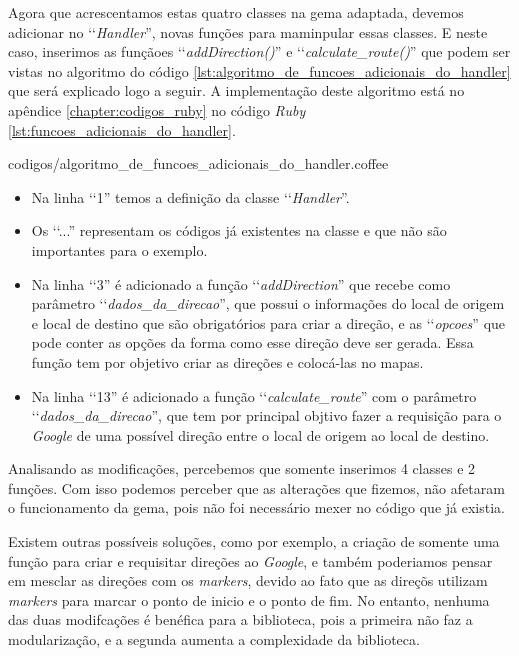 Agora que acrescentamos estas quatro classes na gema adaptada, devemos adicionar no ‘‘\emph{Handler}'', 
novas funções para maminpular essas classes. E neste caso, inserimos as funçãoes ‘‘\emph{addDirection()}'' e 
‘‘\emph{calculate\_route()}'' que podem ser vistas no algoritmo do código
\ref{lst:algoritmo_de_funcoes_adicionais_do_handler} que será explicado logo a seguir. A implementação deste
algoritmo está no apêndice \ref{chapter:codigos_ruby} no código \emph{Ruby}
\ref{lst:funcoes_adicionais_do_handler}.


{codigos/algoritmo_de_funcoes_adicionais_do_handler.coffee}

\begin{itemize}

 \item Na linha ‘‘1'' temos a definição da classe ‘‘\emph{Handler}''.
 
 \item Os ‘‘...'' representam os códigos já existentes na classe e que não são importantes para o
 exemplo.

 \item Na linha ‘‘3'' é adicionado a função ‘‘\emph{addDirection}'' que recebe como parâmetro 
 ‘‘\emph{dados\_da\_direcao}'', que possui o informações do local de origem e local de destino que são 
 obrigatórios para criar a direção, e as ‘‘\emph{opcoes}'' que pode conter as opções da forma
 como esse direção deve ser gerada. Essa função tem por objetivo criar as direções e colocá-las no mapas.
 
 \item Na linha ‘‘13'' é adicionado a função ‘‘\emph{calculate\_route}'' com o parâmetro 
 ‘‘\emph{dados\_da\_direcao}'', que tem por principal objtivo fazer a requisição para o \emph{Google} de uma 
 possível direção entre o local de origem ao local de destino.
 
\end{itemize}

Analisando as modificações, percebemos que somente inserimos 4 classes e 2 funções. Com isso podemos
perceber que as alterações que fizemos, não afetaram o funcionamento da gema, pois não foi
necessário mexer no código que já existia.

Existem outras possíveis soluções, como por exemplo, a criação de somente uma função para criar e
requisitar direções ao \emph{Google}, e também poderiamos pensar em mesclar as direções com os
\emph{markers}, devido ao fato que as direçõs utilizam \emph{markers} para marcar o ponto de inicio e
o ponto de fim. No entanto, nenhuma das duas modifcações é benéfica para a biblioteca, pois a primeira
não faz a modularização, e a segunda aumenta a complexidade da biblioteca.


